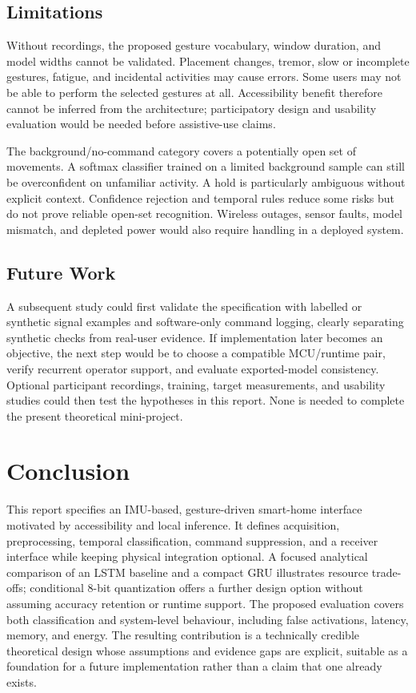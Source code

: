 \documentclass[conference]{IEEEtran}
\begin{document}
\subsection{Limitations}
Without recordings, the proposed gesture vocabulary, window duration, and model widths cannot be validated. Placement changes, tremor, slow or incomplete gestures, fatigue, and incidental activities may cause errors. Some users may not be able to perform the selected gestures at all. Accessibility benefit therefore cannot be inferred from the architecture; participatory design and usability evaluation would be needed before assistive-use claims.

The background/no-command category covers a potentially open set of movements. A softmax classifier trained on a limited background sample can still be overconfident on unfamiliar activity. A hold is particularly ambiguous without explicit context. Confidence rejection and temporal rules reduce some risks but do not prove reliable open-set recognition. Wireless outages, sensor faults, model mismatch, and depleted power would also require handling in a deployed system.

\subsection{Future Work}
\balance
A subsequent study could first validate the specification with labelled or synthetic signal examples and software-only command logging, clearly separating synthetic checks from real-user evidence. If implementation later becomes an objective, the next step would be to choose a compatible MCU/runtime pair, verify recurrent operator support, and evaluate exported-model consistency. Optional participant recordings, training, target measurements, and usability studies could then test the hypotheses in this report. None is needed to complete the present theoretical mini-project.

\section{Conclusion}
This report specifies an IMU-based, gesture-driven smart-home interface motivated by accessibility and local inference. It defines acquisition, preprocessing, temporal classification, command suppression, and a receiver interface while keeping physical integration optional. A focused analytical comparison of an LSTM baseline and a compact GRU illustrates resource trade-offs; conditional 8-bit quantization offers a further design option without assuming accuracy retention or runtime support. The proposed evaluation covers both classification and system-level behaviour, including false activations, latency, memory, and energy. The resulting contribution is a technically credible theoretical design whose assumptions and evidence gaps are explicit, suitable as a foundation for a future implementation rather than a claim that one already exists.



\end{document}
